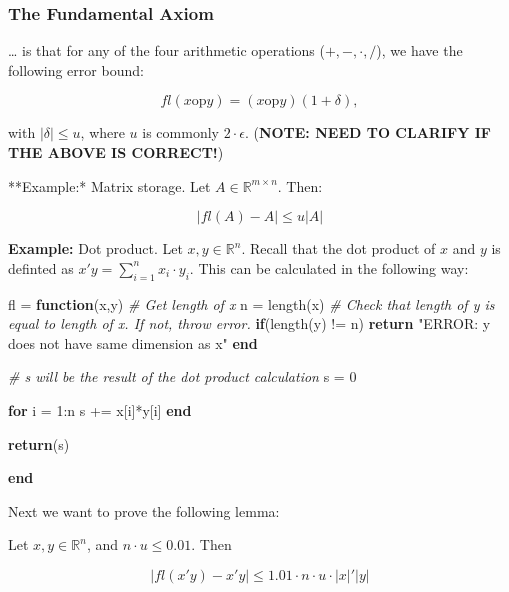 \documentclass[]{book}
\newenvironment{Shaded}{\begin{snugshade}}{\end{snugshade}}
\newcommand{\KeywordTok}[1]{\textcolor[rgb]{0.13,0.29,0.53}{\textbf{#1}}}
\newcommand{\FloatTok}[1]{\textcolor[rgb]{0.00,0.00,0.81}{#1}}
\newcommand{\StringTok}[1]{\textcolor[rgb]{0.31,0.60,0.02}{#1}}
\newcommand{\CommentTok}[1]{\textcolor[rgb]{0.56,0.35,0.01}{\textit{#1}}}
\newcommand{\NormalTok}[1]{#1}
\theoremstyle{definition}
\theoremstyle{definition}
\theoremstyle{definition}
\theoremstyle{remark}
\let\BeginKnitrBlock\begin \let\EndKnitrBlock\end
\begin{document}
\subsubsection{The Fundamental Axiom}\label{the-fundamental-axiom}

\ldots{} is that for any of the four arithmetic operations
(\(+, -, \cdot, /\)), we have the following error bound:

\[
fl(x \text{op} y) = (x \text{op} y)(1+\delta),
\]

with \(|\delta| \leq u\), where \(u\) is commonly \(2\cdot \epsilon\).
(\textbf{NOTE: NEED TO CLARIFY IF THE ABOVE IS CORRECT!})

**Example:* Matrix storage. Let \(A \in \mathbb{R}^{m\times n}\). Then:

\[
\left| fl(A) - A \right | \leq u \left | A \right |
\]

\textbf{Example:} Dot product. Let \(x,y \in \mathbb{R}^{n}\). Recall
that the dot product of \(x\) and \(y\) is definted as
\(x'y = \sum_{i=1}^{n} x_i \cdot y_i\). This can be calculated in the
following way:

\begin{Shaded}
\begin{Highlighting}[]
\NormalTok{fl = }\KeywordTok{function}\NormalTok{(x,y)}
  \CommentTok{# Get length of x}
\NormalTok{  n = length(x)}
  \CommentTok{# Check that length of y is equal to length of x. If not, throw error.}
  \KeywordTok{if}\NormalTok{(length(y) != n)}
    \KeywordTok{return} \StringTok{"ERROR: y does not have same dimension as x"}
  \KeywordTok{end}
  
  \CommentTok{# s will be the result of the dot product calculation}
\NormalTok{  s = }\FloatTok{0}
  
  \KeywordTok{for}\NormalTok{ i = }\FloatTok{1}\NormalTok{:n}
\NormalTok{    s += x[i]*y[i]}
  \KeywordTok{end}
  
  \KeywordTok{return}\NormalTok{(s)}
  
\KeywordTok{end}
\end{Highlighting}
\end{Shaded}

Next we want to prove the following lemma:

\BeginKnitrBlock{lemma}
\protect\hypertarget{lem:unnamed-chunk-10}{}{\label{lem:unnamed-chunk-10}
}Let \(x,y \in \mathbb{R}^n\), and \(n\cdot u \leq 0.01\). Then

\[
\left | fl(x'y) - x'y \right | \leq 1.01 \cdot n\cdot u \cdot \left|x\right|'\left|y\right|
\]
\EndKnitrBlock{lemma}
\end{document}

